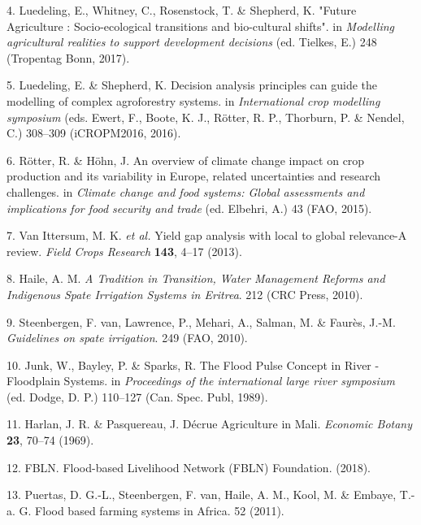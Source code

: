 \documentclass[12pt,oneside]{article}
\begin{document}
\leavevmode\hypertarget{ref-Luedeling_et_al_2017}{}%
4. Luedeling, E., Whitney, C., Rosenstock, T. \& Shepherd, K. "Future
Agriculture : Socio-ecological transitions and bio-cultural shifts". in
\emph{Modelling agricultural realities to support development decisions}
(ed. Tielkes, E.) 248 (Tropentag Bonn, 2017).

\leavevmode\hypertarget{ref-Luedeling_and_Shepherd_2016}{}%
5. Luedeling, E. \& Shepherd, K. Decision analysis principles can guide
the modelling of complex agroforestry systems. in \emph{International
crop modelling symposium} (eds. Ewert, F., Boote, K. J., Rötter, R. P.,
Thorburn, P. \& Nendel, C.) 308--309 (iCROPM2016, 2016).

\leavevmode\hypertarget{ref-Rotter_and_Hohn_2015}{}%
6. Rötter, R. \& Höhn, J. An overview of climate change impact on crop
production and its variability in Europe, related uncertainties and
research challenges. in \emph{Climate change and food systems: Global
assessments and implications for food security and trade} (ed. Elbehri,
A.) 43 (FAO, 2015).

\leavevmode\hypertarget{ref-VanIttersum_et_al_2013}{}%
7. Van Ittersum, M. K. \emph{et al.} Yield gap analysis with local to
global relevance-A review. \emph{Field Crops Research} \textbf{143},
4--17 (2013).

\leavevmode\hypertarget{ref-Haile_2010}{}%
8. Haile, A. M. \emph{A Tradition in Transition, Water Management
Reforms and Indigenous Spate Irrigation Systems in Eritrea}. 212 (CRC
Press, 2010).

\leavevmode\hypertarget{ref-VanSteenbergen_et_al_2010}{}%
9. Steenbergen, F. van, Lawrence, P., Mehari, A., Salman, M. \& Faurès,
J.-M. \emph{Guidelines on spate irrigation}. 249 (FAO, 2010).

\leavevmode\hypertarget{ref-Junk_et_al_1989}{}%
10. Junk, W., Bayley, P. \& Sparks, R. The Flood Pulse Concept in River
- Floodplain Systems. in \emph{Proceedings of the international large
river symposium} (ed. Dodge, D. P.) 110--127 (Can. Spec. Publ, 1989).

\leavevmode\hypertarget{ref-Harlan_Pasquereau_1969}{}%
11. Harlan, J. R. \& Pasquereau, J. Décrue Agriculture in Mali.
\emph{Economic Botany} \textbf{23}, 70--74 (1969).

\leavevmode\hypertarget{ref-FBLN_2018}{}%
12. FBLN. Flood-based Livelihood Network (FBLN) Foundation. (2018).

\leavevmode\hypertarget{ref-Puertas_et_al_2011}{}%
13. Puertas, D. G.-L., Steenbergen, F. van, Haile, A. M., Kool, M. \&
Embaye, T.-a. G. Flood based farming systems in Africa. 52 (2011).
\end{document}
